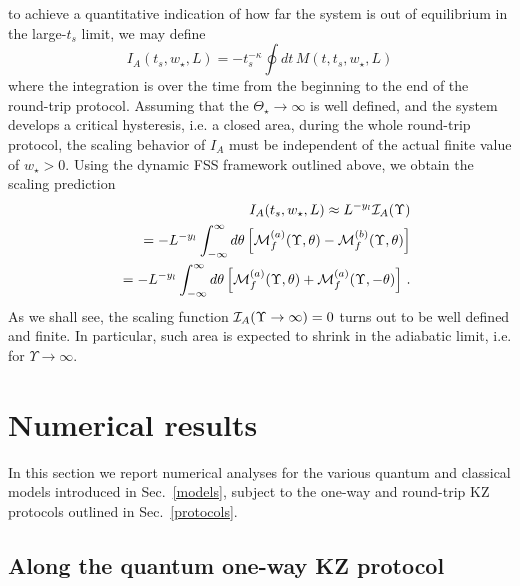 to achieve a quantitative indication of how far the system is out of
equilibrium in the large-$t_s$ limit, we may define~\cite{pelissetto2016off}
\begin{equation}
  I_A(t_s,w_\star,L) = - t_s^{-\kappa} \oint dt\, M(t,t_s,w_\star,L)
\label{aharea}
\end{equation}
where the integration is over the time from the beginning to the end
of the round-trip protocol.  Assuming that the $\Theta_\star\to\infty$
is well defined, and the system develops a critical hysteresis, i.e. a
closed area, during the whole round-trip protocol, the scaling
behavior of $I_A$ must be independent of the actual finite value of
$w_\star>0$. Using the dynamic FSS framework outlined above, we obtain
the scaling prediction
\begin{eqnarray}
&&  I_A(t_s,w_\star,L) \approx L^{-y_l} {\cal I}_A(\Upsilon)   
\label{IAsca}\\
&& = - L^{-y_l} 
  \int_{-\infty}^\infty 
  d\theta \left[ {\cal M}_f^{(a)}(\Upsilon,\theta) -
  {\cal M}_f^{(b)}(\Upsilon,\theta)\right]
  \nonumber\\
  && = - L^{-y_l} 
  \int_{-\infty}^\infty 
  d\theta \left[{\cal M}_f^{(a)}(\Upsilon,\theta) +
  {\cal M}_f^{(a)}(\Upsilon,-\theta)\right]\,.
  \nonumber
\end{eqnarray}
As we shall see, the scaling function ${\cal I}_A(\Upsilon\to\infty)=
0$ turns out to be well defined and finite.
In particular, such area
is expected to shrink in the adiabatic limit, i.e. for
$\Upsilon\to\infty$.

  
\section{Numerical results}
\label{numresrotrip}

In this section we report numerical analyses for the various quantum
and classical models introduced in Sec.~\ref{models}, subject to the
one-way and round-trip KZ protocols outlined in Sec.~\ref{protocols}.



\subsection{Along the quantum one-way KZ protocol}
\label{qoneway}



